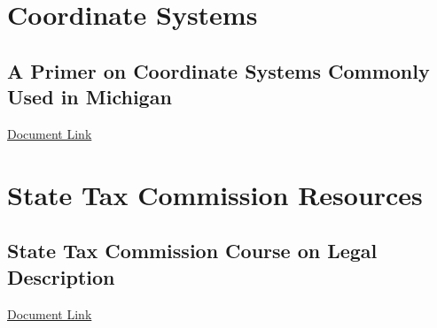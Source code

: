 
\section{Coordinate Systems}
\subsection[Coordinate Systems for Michigan]{A Primer on Coordinate Systems Commonly Used in Michigan}
\href{../../documentation/references/geo101/MiCoordinateSystems.pdf}{Document Link}
\section{State Tax Commission Resources}
\subsection[Course on Legal Description]{State Tax Commission Course on Legal Description}
\href{../../documentation/references/geo101/State_Tax_Commission_Legal_Descriptions_Course_346936_7.pdf}{Document Link}
\clearpage


